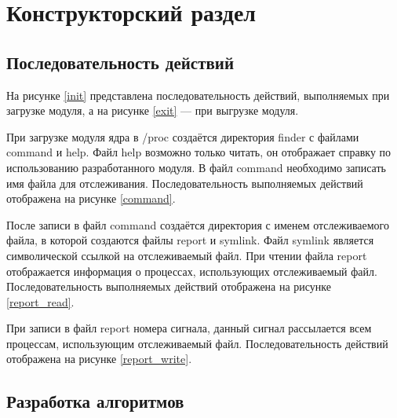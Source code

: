 \chapter{Конструкторский раздел}

\section{Последовательность действий}

На рисунке \ref{init} представлена последовательность действий, выполняемых при загрузке модуля, а на рисунке \ref{exit} --- при выгрузке модуля.



При загрузке модуля ядра в /proc создаётся директория finder с файлами command и help. 
Файл help возможно только читать, он отображает справку по использованию разработанного модуля.
В файл command необходимо записать имя файла для отслеживания. Последовательность выполняемых действий отображена на рисунке \ref{command}.


После записи в файл command создаётся директория с именем отслеживаемого файла, в которой создаются файлы report и symlink.
Файл symlink является символической ссылкой на отслеживаемый файл.
При чтении файла report отображается информация о процессах, использующих отслеживаемый файл. Последовательность выполняемых действий отображена на рисунке \ref{report_read}.


При записи в файл report номера сигнала, данный сигнал рассылается всем процессам, использующим отслеживаемый файл. Последовательность действий отображена на рисунке \ref{report_write}.


\pagebreak

\clearpage

\section{Разработка алгоритмов}

